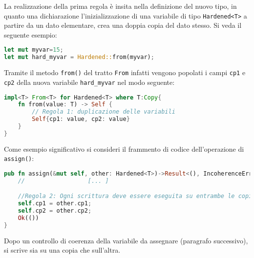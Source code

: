 \noindent
La realizzazione della prima regola è insita nella definizione del nuovo tipo, in quanto una dichiarazione l'inizializzazione di una variabile di tipo \texttt{Hardened<T>} a partire da un dato elementare, crea una doppia copia del dato stesso. Si veda il seguente esempio: 
\begin{lstlisting}[language=rust, style=boxed]
let mut myvar=15; 
let mut hard_myvar = Hardened::from(myvar);
\end{lstlisting}
Tramite il metodo \texttt{from()} del tratto \texttt{From} infatti vengono popolati i campi \texttt{cp1} e \texttt{cp2} della nuova variabile \texttt{hard\_myvar} nel modo seguente: 

\begin{lstlisting}[language=rust, style=boxed]
impl<T> From<T> for Hardened<T> where T:Copy{
    fn from(value: T) -> Self {
        // Regola 1: duplicazione delle variabili
        Self{cp1: value, cp2: value}
    }
}   
\end{lstlisting}

\noindent
\begin{center}
\end{center}
Come esempio significativo si consideri il frammento di codice dell'operazione di \texttt{assign()}:

\begin{lstlisting}[language=rust, style=boxed]
pub fn assign(&mut self, other: Hardened<T>)->Result<(), IncoherenceError>{
    //                  [... ]

    //Regola 2: Ogni scrittura deve essere eseguita su entrambe le copie
    self.cp1 = other.cp1;
    self.cp2 = other.cp2;
    Ok(())
}
\end{lstlisting}
Dopo un controllo di coerenza della variabile da assegnare (paragrafo successivo), si scrive sia su una copia che sull'altra.


